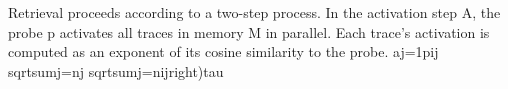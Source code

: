 {}Retrieval proceeds according to a two-step process. In the activation step \markdownRendererDollarSign{}A\markdownRendererDollarSign{}, the probe \markdownRendererDollarSign{}p\markdownRendererDollarSign{} activates all traces in memory \markdownRendererDollarSign{}M\markdownRendererDollarSign{} in parallel. Each trace's activation is computed as an exponent of its cosine similarity to the probe.\markdownRendererInterblockSeparator
{}\markdownRendererDollarSign{}\markdownRendererDollarSign{}a\markdownRendererLeftBrace{}j=1\markdownRendererRightBrace{}\markdownRendererLeftBrace{}p\markdownRendererLeftBrace{}ij\markdownRendererRightBrace{}\markdownRendererRightBrace{}\markdownRendererRightBrace{} \markdownRendererLeftBrace{}\markdownRendererBackslash{}sqrt\markdownRendererLeftBrace{}\markdownRendererBackslash{}sum\markdownRendererCircumflex{}\markdownRendererLeftBrace{}j=n\markdownRendererRightBrace{}j\markdownRendererRightBrace{}\markdownRendererRightBrace{} \markdownRendererBackslash{}sqrt\markdownRendererLeftBrace{}\markdownRendererBackslash{}sum\markdownRendererCircumflex{}\markdownRendererLeftBrace{}j=n\markdownRendererRightBrace{}\markdownRendererLeftBrace{}ij\markdownRendererRightBrace{}\markdownRendererRightBrace{}\markdownRendererRightBrace{}\markdownRendererRightBrace{}\markdownRendererRightBrace{}\markdownRendererBackslash{}right)\markdownRendererCircumflex{}\markdownRendererLeftBrace{}\markdownRendererBackslash{}tau\markdownRendererRightBrace{}\markdownRendererDollarSign{}\markdownRendererDollarSign{}\markdownRendererInterblockSeparator
